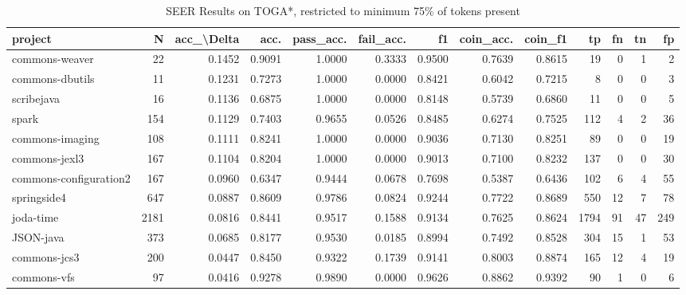 \begin{table}
\centering
\caption{SEER Results on TOGA*, restricted to minimum 75\% of tokens present}
\label{tab:toga_results_25}
\begin{tabular}{lrrrrrrrrrrrr}
\toprule
                project &      N &  acc\_\textbackslash Delta &    acc. &  pass\_acc. &  fail\_acc. &      f1 &  coin\_acc. &  coin\_f1 &     tp &   fn &   tn &    fp \\
\midrule
         commons-weaver &     22 &      0.1452 &  0.9091 &     1.0000 &     0.3333 &  0.9500 &     0.7639 &   0.8615 &     19 &    0 &    1 &     2 \\
        commons-dbutils &     11 &      0.1231 &  0.7273 &     1.0000 &     0.0000 &  0.8421 &     0.6042 &   0.7215 &      8 &    0 &    0 &     3 \\
             scribejava &     16 &      0.1136 &  0.6875 &     1.0000 &     0.0000 &  0.8148 &     0.5739 &   0.6860 &     11 &    0 &    0 &     5 \\
                  spark &    154 &      0.1129 &  0.7403 &     0.9655 &     0.0526 &  0.8485 &     0.6274 &   0.7525 &    112 &    4 &    2 &    36 \\
        commons-imaging &    108 &      0.1111 &  0.8241 &     1.0000 &     0.0000 &  0.9036 &     0.7130 &   0.8251 &     89 &    0 &    0 &    19 \\
          commons-jexl3 &    167 &      0.1104 &  0.8204 &     1.0000 &     0.0000 &  0.9013 &     0.7100 &   0.8232 &    137 &    0 &    0 &    30 \\
 commons-configuration2 &    167 &      0.0960 &  0.6347 &     0.9444 &     0.0678 &  0.7698 &     0.5387 &   0.6436 &    102 &    6 &    4 &    55 \\
            springside4 &    647 &      0.0887 &  0.8609 &     0.9786 &     0.0824 &  0.9244 &     0.7722 &   0.8689 &    550 &   12 &    7 &    78 \\
              joda-time &   2181 &      0.0816 &  0.8441 &     0.9517 &     0.1588 &  0.9134 &     0.7625 &   0.8624 &   1794 &   91 &   47 &   249 \\
              JSON-java &    373 &      0.0685 &  0.8177 &     0.9530 &     0.0185 &  0.8994 &     0.7492 &   0.8528 &    304 &   15 &    1 &    53 \\
           commons-jcs3 &    200 &      0.0447 &  0.8450 &     0.9322 &     0.1739 &  0.9141 &     0.8003 &   0.8874 &    165 &   12 &    4 &    19 \\
            commons-vfs &     97 &      0.0416 &  0.9278 &     0.9890 &     0.0000 &  0.9626 &     0.8862 &   0.9392 &     90 &    1 &    0 &     6 \\

\end{tabular}
\end{table}

